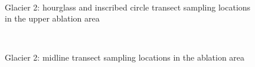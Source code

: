 \documentclass{sfuthesis}
\begin{document}
\begin{appendices}
\begin{figure}[H]
	\\
\caption[]{Glacier 2: hourglass and inscribed circle transect sampling locations in the upper ablation area}
\end{figure}
	\begin{figure}[H]
	\centering
	\\
\caption[]{Glacier 2: midline transect sampling locations in the ablation area}
\end{figure}
	\begin{figure}[H]
	\centering

\end{figure}
\end{appendices}
\end{document}
